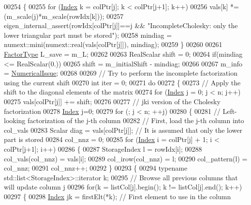 \begin{DoxyCode}
00254   \{
00255     \textcolor{keywordflow}{for} (\hyperlink{namespace_eigen_a62e77e0933482dafde8fe197d9a2cfde}{Index} k = colPtr[j]; k < colPtr[j+1]; k++)
00256       vals[k] *= (m\_scale(j)*m\_scale(rowIdx[k]));
00257     eigen\_internal\_assert(rowIdx[colPtr[j]]==j && \textcolor{stringliteral}{"IncompleteCholesky: only the lower triangular part must
       be stored"});
00258     mindiag = numext::mini(numext::real(vals[colPtr[j]]), mindiag);
00259   \}
00260 
00261   \hyperlink{group___sparse_core___module}{FactorType} L\_save = m\_L;
00262   
00263   RealScalar shift = 0;
00264   \textcolor{keywordflow}{if}(mindiag <= RealScalar(0.))
00265     shift = m\_initialShift - mindiag;
00266 
00267   m\_info = \hyperlink{group__enums_gga85fad7b87587764e5cf6b513a9e0ee5eaaf9b736d310a664e7729d163a035cc5f}{NumericalIssue};
00268 
00269   \textcolor{comment}{// Try to perform the incomplete factorization using the current shift}
00270   \textcolor{keywordtype}{int} iter = 0;
00271   \textcolor{keywordflow}{do}
00272   \{
00273     \textcolor{comment}{// Apply the shift to the diagonal elements of the matrix}
00274     \textcolor{keywordflow}{for} (\hyperlink{namespace_eigen_a62e77e0933482dafde8fe197d9a2cfde}{Index} j = 0; j < n; j++)
00275       vals[colPtr[j]] += shift;
00276 
00277     \textcolor{comment}{// jki version of the Cholesky factorization}
00278     \hyperlink{namespace_eigen_a62e77e0933482dafde8fe197d9a2cfde}{Index} j=0;
00279     \textcolor{keywordflow}{for} (; j < n; ++j)
00280     \{
00281       \textcolor{comment}{// Left-looking factorization of the j-th column}
00282       \textcolor{comment}{// First, load the j-th column into col\_vals}
00283       Scalar diag = vals[colPtr[j]];  \textcolor{comment}{// It is assumed that only the lower part is stored}
00284       col\_nnz = 0;
00285       \textcolor{keywordflow}{for} (\hyperlink{namespace_eigen_a62e77e0933482dafde8fe197d9a2cfde}{Index} i = colPtr[j] + 1; i < colPtr[j+1]; i++)
00286       \{
00287         StorageIndex l = rowIdx[i];
00288         col\_vals(col\_nnz) = vals[i];
00289         col\_irow(col\_nnz) = l;
00290         col\_pattern(l) = col\_nnz;
00291         col\_nnz++;
00292       \}
00293       \{
00294         \textcolor{keyword}{typename} std::list<StorageIndex>::iterator k;
00295         \textcolor{comment}{// Browse all previous columns that will update column j}
00296         \textcolor{keywordflow}{for}(k = listCol[j].begin(); k != listCol[j].end(); k++)
00297         \{
00298           \hyperlink{namespace_eigen_a62e77e0933482dafde8fe197d9a2cfde}{Index} jk = firstElt(*k); \textcolor{comment}{// First element to use in the column}

\end{DoxyCode}
